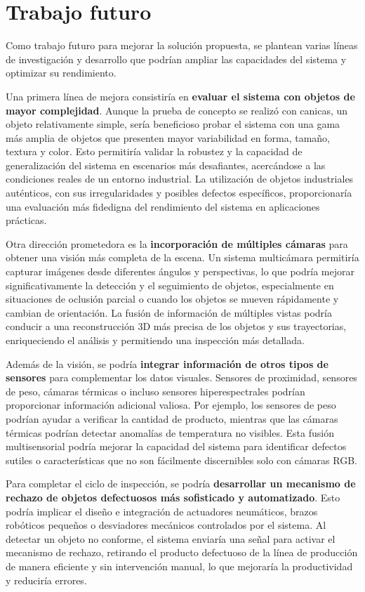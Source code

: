 \documentclass[11pt,spanish,listoffigures,listoftables]{tfgetsinf}
\begin{document}
\section{Trabajo futuro}

Como trabajo futuro para mejorar la solución propuesta, se plantean varias líneas de investigación y desarrollo que podrían ampliar las capacidades del sistema y optimizar su rendimiento.

Una primera línea de mejora consistiría en \textbf{evaluar el sistema con objetos de mayor complejidad}. Aunque la prueba de concepto se realizó con canicas, un objeto relativamente simple, sería beneficioso probar el sistema con una gama más amplia de objetos que presenten mayor variabilidad en forma, tamaño, textura y color. Esto permitiría validar la robustez y la capacidad de generalización del sistema en escenarios más desafiantes, acercándose a las condiciones reales de un entorno industrial. La utilización de objetos industriales auténticos, con sus irregularidades y posibles defectos específicos, proporcionaría una evaluación más fidedigna del rendimiento del sistema en aplicaciones prácticas.

Otra dirección prometedora es la \textbf{incorporación de múltiples cámaras} para obtener una visión más completa de la escena. Un sistema multicámara permitiría capturar imágenes desde diferentes ángulos y perspectivas, lo que podría mejorar significativamente la detección y el seguimiento de objetos, especialmente en situaciones de oclusión parcial o cuando los objetos se mueven rápidamente y cambian de orientación. La fusión de información de múltiples vistas podría conducir a una reconstrucción 3D más precisa de los objetos y sus trayectorias, enriqueciendo el análisis y permitiendo una inspección más detallada.

Además de la visión, se podría \textbf{integrar información de otros tipos de sensores} para complementar los datos visuales. Sensores de proximidad, sensores de peso, cámaras térmicas o incluso sensores hiperespectrales podrían proporcionar información adicional valiosa. Por ejemplo, los sensores de peso podrían ayudar a verificar la cantidad de producto, mientras que las cámaras térmicas podrían detectar anomalías de temperatura no visibles. Esta fusión multisensorial podría mejorar la capacidad del sistema para identificar defectos sutiles o características que no son fácilmente discernibles solo con cámaras RGB.

Para completar el ciclo de inspección, se podría \textbf{desarrollar un mecanismo de rechazo de objetos defectuosos más sofisticado y automatizado}. Esto podría implicar el diseño e integración de actuadores neumáticos, brazos robóticos pequeños o desviadores mecánicos controlados por el sistema. Al detectar un objeto no conforme, el sistema enviaría una señal para activar el mecanismo de rechazo, retirando el producto defectuoso de la línea de producción de manera eficiente y sin intervención manual, lo que mejoraría la productividad y reduciría errores.
\end{document}
